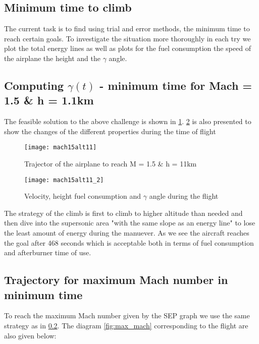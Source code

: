 \subsection{Minimum time to climb}

\noindent The current task is to find using trial and error methods, the minimum time 
to reach certain goals. To investigate the situation more thoroughly 
in each try we plot the total energy lines as well as plots for the fuel consumption
the speed of the airplane the height and the $\gamma$ angle.

\subsection{Computing $\gamma(t)$  - minimum time for Mach = 1.5 \& h = 1.1km}
\label{sec:m15h11}

The feasible solution to the above challenge is shown in \ref{fig:m15h11}. \ref{fig:m15h11_2}
is also presented to show the changes of the different properties during the time of flight

\begin{figure}[H]
    \centering
    \texttt{[image: mach15alt11]}
    \caption{Trajector of the airplane to reach M = 1.5 \& h = 11km}
    \label{fig:m15h11}
\end{figure}

\begin{figure}[H]
    \centering
    \texttt{[image: mach15alt11\_2]}
    \caption{Velocity, height fuel consumption and $\gamma$ angle during the flight}
    \label{fig:m15h11_2}
\end{figure}

The strategy of the climb is first to climb to higher altitude than needed and then
dive into the supersonic area "with the same slope as an energy line" to
lose the least amount of energy during the manuever.
As we see  the aircraft reaches the goal after 468 seconds which is acceptable both in terms of 
fuel consumption and afterburner time of use.


\subsection{Trajectory for maximum Mach number in minimum time}
To reach the maximum Mach number given by the SEP graph we use the same
strategy as in \ref{sec:m15h11}. The diagram \ref{fig:max_mach} corresponding to the flight are also given below:

